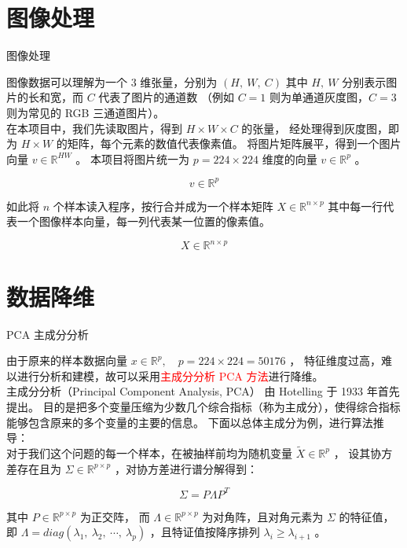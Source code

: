 \documentclass[11pt]{beamer}
\begin{document}
\section{图像处理}
\begin{frame}{图像处理}{}
\fontsize{9pt}{11pt}\selectfont

图像数据可以理解为一个 $3$ 维张量，分别为 $(H,\ W,\ C)$ 
其中 $H,\ W$ 分别表示图片的长和宽，而 $C$ 代表了图片的通道数
（例如 $C = 1$ 则为单通道灰度图，$C = 3$ 则为常见的 RGB 三通道图片）。\\[0.5em]

在本项目中，我们先读取图片，得到 $H \times W \times C$ 的张量，
经处理得到灰度图，即为 $H \times W$ 的矩阵，每个元素的数值代表像素值。
将图片矩阵展平，得到一个图片向量 $v \in \mathbb{R}^{HW}$ 。
本项目将图片统一为 $p = 224 \times 224$ 维度的向量 $v \in \mathbb{R}^p$ 。

$$
v \in \mathbb{R}^p
$$

如此将 $n$ 个样本读入程序，按行合并成为一个样本矩阵 $X \in \mathbb{R}^{n \times p}$ 
其中每一行代表一个图像样本向量，每一列代表某一位置的像素值。

$$
X \in \mathbb{R}^{n \times p}
$$

\end{frame}



\section{数据降维}

\begin{frame}{PCA 主成分分析}{}
\fontsize{9pt}{11pt}\selectfont

由于原来的样本数据向量 $x \in \mathbb{R}^p,\quad p = 224\times 224 = 50176$ ，
特征维度过高，难以进行分析和建模，故可以采用\textcolor{red}{主成分分析 PCA 方法}进行降维。\\[0.5em]

主成分分析（Principal Component Analysis, PCA）
由 Hotelling 于 1933 年首先提出\citep*{hotelling1933pca}。 
目的是把多个变量压缩为少数几个综合指标（称为主成分），使得综合指标能够包含原来的多个变量的主要的信息。
下面以总体主成分为例，进行算法推导：\\[0.5em]

对于我们这个问题的每一个样本，在被抽样前均为随机变量 $\widetilde{X} \in \mathbb{R}^p$ ，
设其协方差存在且为 $\Sigma \in \mathbb{R}^{p \times p}$ ，对协方差进行谱分解得到：

$$
\Sigma = P \Lambda P^T
$$

其中 $P \in \mathbb{R}^{p\times p}$ 为正交阵，
而 $\Lambda \in \mathbb{R}^{p \times p}$ 为对角阵，且对角元素为 $\Sigma$ 的特征值，即 $\Lambda = diag(\lambda_1,\ \lambda_2,\ \cdots,\ \lambda_p)$ ，且特证值按降序排列 $\lambda_{i} \geq \lambda_{i+1}$ 。


\end{frame}
\end{document}
